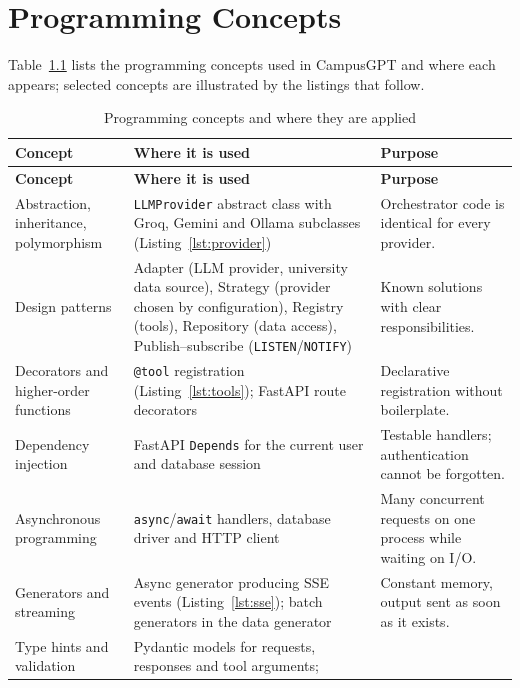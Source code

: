 \documentclass[11pt,a4paper,oneside]{report}
\begin{document}
\chapter{Programming Concepts}

Table~\ref{tab:concepts} lists the programming concepts used in CampusGPT and where each
appears; selected concepts are illustrated by the listings that follow.

\begin{longtable}{@{}>{\raggedright\arraybackslash}p{3.6cm}>{\raggedright\arraybackslash}p{5.9cm}>{\raggedright\arraybackslash}p{4.9cm}@{}}
\caption{Programming concepts and where they are applied}\label{tab:concepts}\\
\toprule
\textbf{Concept} & \textbf{Where it is used} & \textbf{Purpose}\\
\midrule
\endfirsthead
\toprule
\textbf{Concept} & \textbf{Where it is used} & \textbf{Purpose}\\
\midrule
\endhead
\bottomrule
\endfoot
Abstraction, inheritance, polymorphism & \texttt{LLMProvider} abstract class with Groq,
Gemini and Ollama subclasses (Listing~\ref{lst:provider}) & Orchestrator code is identical
for every provider.\\
Design patterns~\cite{gamma1994} & Adapter (LLM provider, university data source),
Strategy (provider chosen by configuration), Registry (tools), Repository (data access),
Publish--subscribe (\texttt{LISTEN}/\texttt{NOTIFY}) & Known solutions with clear
responsibilities.\\
Decorators and higher-order functions~\cite{pep318} & \texttt{@tool} registration
(Listing~\ref{lst:tools}); FastAPI route decorators & Declarative registration without
boilerplate.\\
Dependency injection & FastAPI \texttt{Depends} for the current user and database session &
Testable handlers; authentication cannot be forgotten.\\
Asynchronous programming~\cite{pep492} & \texttt{async}/\texttt{await} handlers, database
driver and HTTP client & Many concurrent requests on one process while waiting on I/O.\\
Generators and streaming~\cite{pep525} & Async generator producing SSE events
(Listing~\ref{lst:sse}); batch generators in the data generator & Constant memory, output
sent as soon as it exists.\\
Type hints and validation & Pydantic models for requests, responses and tool arguments;

\end{longtable}
\end{document}
